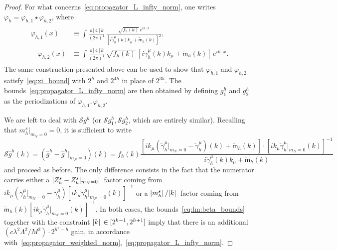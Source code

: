 \documentclass[a4paper, 11pt]{article}
\newcommand{\cutoff}{\Lambda}								%
\newcommand{\sing}[2]{{#1}^{#2}}							%
\renewcommand{\phi}{\varphi}								%
\theoremstyle{thm}
\begin{document}
\begin{proof}
For what concerns~\eqref{eq:propagator_L_infty_norm}, one writes $\phi_h = \phi_{h, 1} \star \phi_{h, 2}$, where
\begin{align}
\label{eq:propagator_splitting_bounds}
\begin{split}
\phi_{h, 1}(x) 
& \equiv \int \frac{\dd[4]{k}}{(2\pi)^4} \, \frac{ \sqrt{f_h(k)} \, e^{i k \cdot x}}{[i \tilde{\gamma}^\mu_h(k) k_\mu + \tilde{\mathsf{m}}_h(k)]^2}, \\
\quad \phi_{h, 2}(x) 
& \equiv \int \frac{\dd[4]{k}}{(2\pi)^4} \, \sqrt{f_h(k)} \, [i \tilde{\gamma}^\mu_h(k) k_\mu + \tilde{\mathsf{m}}_h(k)] \, e^{i k \cdot x}. 
\end{split}
\end{align}
The same construction presented above can be used to show that $\phi_{h, 1}$ and $\phi_{h, 2}$ satisfy~\eqref{eq:xi_bound} with $2^h$ and $2^{4h}$ in place of $2^{3h}$. The bounds~\eqref{eq:propagator_L_infty_norm} are then obtained by defining $\sing{g}{h}_1$ and $\sing{g}{h}_2$ as the periodizations of $\phi_{h, 1}, \phi_{h, 2}$.

We are left to deal with $\mathscr{S} \sing{g}{h}$ (or $\mathscr{S} \sing{g}{h}_1, \mathscr{S} \sing{g}{h}_2$, which are entirely similar). Recalling that $m^s_h \vert_{m_N = 0} = 0$, it is sufficient to write
\begin{equation}
\mathscr{S} \sing{\hat{g}}{h}(k) = (\sing{\hat{g}}{h} - \sing{\hat{g}}{h} \vert_{m_N = 0})(k) = f_h(k) \frac{[i k_\mu (\tilde{\gamma}^\mu_h \vert_{m_N = 0} - \tilde{\gamma}^\mu_h)(k) + \tilde{\mathsf{m}}_h(k)] \cdot [i k_\mu \tilde{\gamma}^\mu_h \vert_{m_N = 0}(k)]^{-1}}{i \tilde{\gamma}^\mu_h(k) k_\mu + \tilde{\mathsf{m}}_h(k)}
\end{equation}
and proceed as before. The only difference consists in the fact that the numerator carries either a $\abs*{Z^s_h - Z^s_h \vert_{m_N = 0}}$ factor coming from $ik_\mu(\tilde{\gamma}^\mu_h \vert_{m_N = 0} - \tilde{\gamma}^\mu_h)[i k_\mu \tilde{\gamma}^\mu_h \vert_{m_N = 0}(k)]^{-1}$ or a $\abs*{m^s_h}/\abs*{k}$ factor coming from $\tilde{\mathsf{m}}_h(k) [i k_\mu \tilde{\gamma}^\mu_h \vert_{m_N = 0}(k)]^{-1}$. In both cases, the bounds~\eqref{eq:lm:beta_bounds} together with the constraint $\abs*{k} \in [2^{h-1}, 2^{h+1}]$ imply that there is an additional $(c \lambda^2 \cutoff^2/M^2) \cdot 2^{h^\star - h}$ gain, in accordance with~\eqref{eq:propagator_weighted_norm},~\eqref{eq:propagator_L_infty_norm}.
\end{proof}
\end{document}
